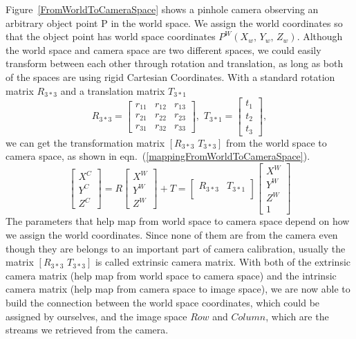 Figure~\ref{FromWorldToCameraSpace} shows a pinhole camera observing an arbitrary object point P in the world  space. We assign the world coordinates so that the object point has world space coordinates \(P^W(X_w, \, Y_w, \, Z_w)\). Although the world space and camera space are two different spaces, we could easily transform between each other through rotation and translation, as long as both of the spaces are using rigid Cartesian Coordinates. With a standard rotation matrix \(R_{3*3}\) and a translation matrix \(T_{3*1}\)
%
\begin{equation}
R_{3*3}%
=  \begin{bmatrix} 
r_{11} & r_{12} & r_{13} \\
r_{21} & r_{22} & r_{23} \\
r_{31} & r_{32} & r_{33}
 \end{bmatrix}%
, \, \, 
T_{3*1}%
=  \begin{bmatrix} 
t_{1} \\
t_{2} \\
t_{3}
 \end{bmatrix} ,%
\label{rotationTranslationMatrixRT}
\end{equation}%
%
we can get the transformation matrix \([R_{3*3} \,\, T_{3*3}]\) from the world space to camera space, as shown in eqn.~(\ref{mappingFromWorldToCameraSpace}).
%
\begin{equation}
\begin{bmatrix} 
X^{C} \\
Y^{C} \\
Z^{C}
 \end{bmatrix}%
=  R \begin{bmatrix} 
X^{W} \\
Y^{W} \\
Z^{W}
 \end{bmatrix}%
 + T
=
\begin{bmatrix} 
R_{3*3} & T_{3*1} \\
\end{bmatrix}%
 \begin{bmatrix} 
X^{W} \\
Y^{W} \\
Z^{W} \\
1
 \end{bmatrix}%
\label{mappingFromWorldToCameraSpace}
\end{equation}%
%
%
%
The parameters that help map from world space to camera space depend on how we assign the world coordinates. Since none of them are from the camera even though they are belongs to an important part of camera calibration, usually the matrix \([R_{3*3} \,\, T_{3*3}]\) is called extrinsic camera matrix. With both of the extrinsic camera matrix (help map from world space to camera space) and the intrinsic camera matrix (help map from camera space to image space), we are now able to build the connection between the world space coordinates, which could be assigned by ourselves, and the image space \(Row\) and \(Column\), which are the streams we retrieved from the camera. 
